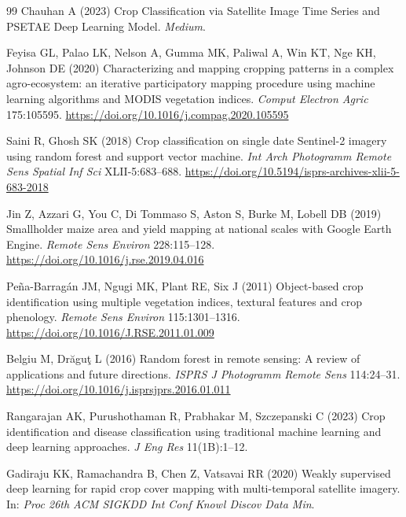 \documentclass[pdflatex,sn-mathphys]{sn-jnl} %
\begin{document}
\begin{thebibliography}{99}
Chauhan A (2023) Crop Classification via Satellite Image Time Series and PSETAE Deep Learning Model. \textit{Medium}.

Feyisa GL, Palao LK, Nelson A, Gumma MK, Paliwal A, Win KT, Nge KH, Johnson DE (2020) Characterizing and mapping cropping patterns in a complex agro-ecosystem: an iterative participatory mapping procedure using machine learning algorithms and MODIS vegetation indices. \textit{Comput Electron Agric} 175:105595. \href{https://doi.org/10.1016/j.compag.2020.105595}{https://doi.org/10.1016/j.compag.2020.105595}

Saini R, Ghosh SK (2018) Crop classification on single date Sentinel-2 imagery using random forest and support vector machine. \textit{Int Arch Photogramm Remote Sens Spatial Inf Sci} XLII-5:683--688. \href{https://doi.org/10.5194/isprs-archives-xlii-5-683-2018}{https://doi.org/10.5194/isprs-archives-xlii-5-683-2018}

Jin Z, Azzari G, You C, Di Tommaso S, Aston S, Burke M, Lobell DB (2019) Smallholder maize area and yield mapping at national scales with Google Earth Engine. \textit{Remote Sens Environ} 228:115--128. \href{https://doi.org/10.1016/j.rse.2019.04.016}{https://doi.org/10.1016/j.rse.2019.04.016}

Pe\~na-Barrag\'an JM, Ngugi MK, Plant RE, Six J (2011) Object-based crop identification using multiple vegetation indices, textural features and crop phenology. \textit{Remote Sens Environ} 115:1301--1316. \href{https://doi.org/10.1016/J.RSE.2011.01.009}{https://doi.org/10.1016/J.RSE.2011.01.009}

Belgiu M, Dr\u{a}gu\c{t} L (2016) Random forest in remote sensing: A review of applications and future directions. \textit{ISPRS J Photogramm Remote Sens} 114:24--31. \href{https://doi.org/10.1016/j.isprsjprs.2016.01.011}{https://doi.org/10.1016/j.isprsjprs.2016.01.011}

Rangarajan AK, Purushothaman R, Prabhakar M, Szczepanski C (2023) Crop identification and disease classification using traditional machine learning and deep learning approaches. \textit{J Eng Res} 11(1B):1--12.

Gadiraju KK, Ramachandra B, Chen Z, Vatsavai RR (2020) Weakly supervised deep learning for rapid crop cover mapping with multi-temporal satellite imagery. In: \textit{Proc 26th ACM SIGKDD Int Conf Knowl Discov Data Min}.


\end{thebibliography}
\end{document}
